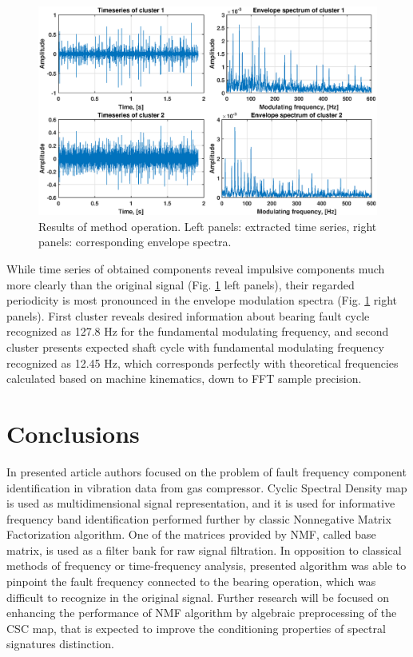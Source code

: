 \documentclass[10pt]{article}
\begin{document}
\begin{figure}[h!]
\centering
\includegraphics[width=\textwidth]{wykresy/out}
\caption{Results of method operation. Left panels: extracted time series, right panels: corresponding envelope spectra.}
\label{fig:out}
\end{figure}

While time series of obtained components reveal impulsive components much more clearly than the original signal (Fig. \ref{fig:out} left panels), their regarded periodicity is most pronounced in the envelope modulation spectra (Fig. \ref{fig:out} right panels). First cluster reveals desired information about bearing fault cycle recognized as 127.8 Hz for the fundamental modulating frequency, and second cluster presents expected shaft cycle with fundamental modulating frequency recognized as 12.45 Hz, which corresponds perfectly with theoretical frequencies calculated based on machine kinematics, down to FFT sample precision.

\section{Conclusions}

In presented article authors focused on the problem of fault frequency component identification in vibration data from gas compressor. Cyclic Spectral Density map is used as multidimensional signal representation, and it is used for informative frequency band identification performed further by classic Nonnegative Matrix Factorization algorithm. One of the matrices provided by NMF, called base matrix, is used as a filter bank for raw signal filtration. In opposition to classical methods of frequency or time-frequency analysis, presented algorithm was able to pinpoint the fault frequency connected to the bearing operation, which was difficult to recognize in the original signal. Further research will be focused on enhancing the performance of NMF algorithm by algebraic preprocessing of the CSC map, that is expected to improve the conditioning properties of spectral signatures distinction.



\end{document}
